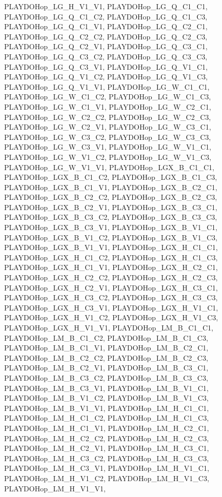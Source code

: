PLAYDOHop\_\-LG\_\-H\_\-V1\_\-V1, PLAYDOHop\_\-LG\_\-Q\_\-C1\_\-C1, PLAYDOHop\_\-LG\_\-Q\_\-C1\_\-C2, PLAYDOHop\_\-LG\_\-Q\_\-C1\_\-C3, PLAYDOHop\_\-LG\_\-Q\_\-C1\_\-V1, PLAYDOHop\_\-LG\_\-Q\_\-C2\_\-C1, PLAYDOHop\_\-LG\_\-Q\_\-C2\_\-C2, PLAYDOHop\_\-LG\_\-Q\_\-C2\_\-C3, PLAYDOHop\_\-LG\_\-Q\_\-C2\_\-V1, PLAYDOHop\_\-LG\_\-Q\_\-C3\_\-C1, PLAYDOHop\_\-LG\_\-Q\_\-C3\_\-C2, PLAYDOHop\_\-LG\_\-Q\_\-C3\_\-C3, PLAYDOHop\_\-LG\_\-Q\_\-C3\_\-V1, PLAYDOHop\_\-LG\_\-Q\_\-V1\_\-C1, PLAYDOHop\_\-LG\_\-Q\_\-V1\_\-C2, PLAYDOHop\_\-LG\_\-Q\_\-V1\_\-C3, PLAYDOHop\_\-LG\_\-Q\_\-V1\_\-V1, PLAYDOHop\_\-LG\_\-W\_\-C1\_\-C1, PLAYDOHop\_\-LG\_\-W\_\-C1\_\-C2, PLAYDOHop\_\-LG\_\-W\_\-C1\_\-C3, PLAYDOHop\_\-LG\_\-W\_\-C1\_\-V1, PLAYDOHop\_\-LG\_\-W\_\-C2\_\-C1, PLAYDOHop\_\-LG\_\-W\_\-C2\_\-C2, PLAYDOHop\_\-LG\_\-W\_\-C2\_\-C3, PLAYDOHop\_\-LG\_\-W\_\-C2\_\-V1, PLAYDOHop\_\-LG\_\-W\_\-C3\_\-C1, PLAYDOHop\_\-LG\_\-W\_\-C3\_\-C2, PLAYDOHop\_\-LG\_\-W\_\-C3\_\-C3, PLAYDOHop\_\-LG\_\-W\_\-C3\_\-V1, PLAYDOHop\_\-LG\_\-W\_\-V1\_\-C1, PLAYDOHop\_\-LG\_\-W\_\-V1\_\-C2, PLAYDOHop\_\-LG\_\-W\_\-V1\_\-C3, PLAYDOHop\_\-LG\_\-W\_\-V1\_\-V1, PLAYDOHop\_\-LGX\_\-B\_\-C1\_\-C1, PLAYDOHop\_\-LGX\_\-B\_\-C1\_\-C2, PLAYDOHop\_\-LGX\_\-B\_\-C1\_\-C3, PLAYDOHop\_\-LGX\_\-B\_\-C1\_\-V1, PLAYDOHop\_\-LGX\_\-B\_\-C2\_\-C1, PLAYDOHop\_\-LGX\_\-B\_\-C2\_\-C2, PLAYDOHop\_\-LGX\_\-B\_\-C2\_\-C3, PLAYDOHop\_\-LGX\_\-B\_\-C2\_\-V1, PLAYDOHop\_\-LGX\_\-B\_\-C3\_\-C1, PLAYDOHop\_\-LGX\_\-B\_\-C3\_\-C2, PLAYDOHop\_\-LGX\_\-B\_\-C3\_\-C3, PLAYDOHop\_\-LGX\_\-B\_\-C3\_\-V1, PLAYDOHop\_\-LGX\_\-B\_\-V1\_\-C1, PLAYDOHop\_\-LGX\_\-B\_\-V1\_\-C2, PLAYDOHop\_\-LGX\_\-B\_\-V1\_\-C3, PLAYDOHop\_\-LGX\_\-B\_\-V1\_\-V1, PLAYDOHop\_\-LGX\_\-H\_\-C1\_\-C1, PLAYDOHop\_\-LGX\_\-H\_\-C1\_\-C2, PLAYDOHop\_\-LGX\_\-H\_\-C1\_\-C3, PLAYDOHop\_\-LGX\_\-H\_\-C1\_\-V1, PLAYDOHop\_\-LGX\_\-H\_\-C2\_\-C1, PLAYDOHop\_\-LGX\_\-H\_\-C2\_\-C2, PLAYDOHop\_\-LGX\_\-H\_\-C2\_\-C3, PLAYDOHop\_\-LGX\_\-H\_\-C2\_\-V1, PLAYDOHop\_\-LGX\_\-H\_\-C3\_\-C1, PLAYDOHop\_\-LGX\_\-H\_\-C3\_\-C2, PLAYDOHop\_\-LGX\_\-H\_\-C3\_\-C3, PLAYDOHop\_\-LGX\_\-H\_\-C3\_\-V1, PLAYDOHop\_\-LGX\_\-H\_\-V1\_\-C1, PLAYDOHop\_\-LGX\_\-H\_\-V1\_\-C2, PLAYDOHop\_\-LGX\_\-H\_\-V1\_\-C3, PLAYDOHop\_\-LGX\_\-H\_\-V1\_\-V1, PLAYDOHop\_\-LM\_\-B\_\-C1\_\-C1, PLAYDOHop\_\-LM\_\-B\_\-C1\_\-C2, PLAYDOHop\_\-LM\_\-B\_\-C1\_\-C3, PLAYDOHop\_\-LM\_\-B\_\-C1\_\-V1, PLAYDOHop\_\-LM\_\-B\_\-C2\_\-C1, PLAYDOHop\_\-LM\_\-B\_\-C2\_\-C2, PLAYDOHop\_\-LM\_\-B\_\-C2\_\-C3, PLAYDOHop\_\-LM\_\-B\_\-C2\_\-V1, PLAYDOHop\_\-LM\_\-B\_\-C3\_\-C1, PLAYDOHop\_\-LM\_\-B\_\-C3\_\-C2, PLAYDOHop\_\-LM\_\-B\_\-C3\_\-C3, PLAYDOHop\_\-LM\_\-B\_\-C3\_\-V1, PLAYDOHop\_\-LM\_\-B\_\-V1\_\-C1, PLAYDOHop\_\-LM\_\-B\_\-V1\_\-C2, PLAYDOHop\_\-LM\_\-B\_\-V1\_\-C3, PLAYDOHop\_\-LM\_\-B\_\-V1\_\-V1, PLAYDOHop\_\-LM\_\-H\_\-C1\_\-C1, PLAYDOHop\_\-LM\_\-H\_\-C1\_\-C2, PLAYDOHop\_\-LM\_\-H\_\-C1\_\-C3, PLAYDOHop\_\-LM\_\-H\_\-C1\_\-V1, PLAYDOHop\_\-LM\_\-H\_\-C2\_\-C1, PLAYDOHop\_\-LM\_\-H\_\-C2\_\-C2, PLAYDOHop\_\-LM\_\-H\_\-C2\_\-C3, PLAYDOHop\_\-LM\_\-H\_\-C2\_\-V1, PLAYDOHop\_\-LM\_\-H\_\-C3\_\-C1, PLAYDOHop\_\-LM\_\-H\_\-C3\_\-C2, PLAYDOHop\_\-LM\_\-H\_\-C3\_\-C3, PLAYDOHop\_\-LM\_\-H\_\-C3\_\-V1, PLAYDOHop\_\-LM\_\-H\_\-V1\_\-C1, PLAYDOHop\_\-LM\_\-H\_\-V1\_\-C2, PLAYDOHop\_\-LM\_\-H\_\-V1\_\-C3, PLAYDOHop\_\-LM\_\-H\_\-V1\_\-V1, 